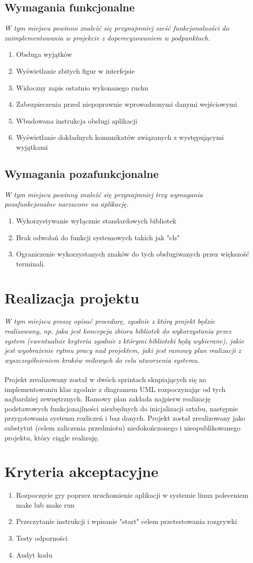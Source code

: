 \documentclass{article}
\begin{document}
\subsection{Wymagania funkcjonalne}
{\small\it W tym miejscu powinno znaleźć się przynajmniej sześć funkcjonalności do zaimplementowania w projekcie z doperecyzowaniem w podpunktach.}
\begin{enumerate}
  \item Obsługa wyjątków
  \item Wyświetlanie zbitych figur w interfejsie
  \item Widoczny zapis ostatnio wykonanego ruchu
  \item Zabezpieczenia przed niepoprawnie wprowadzonymi danymi wejściowymi
  \item Wbudowana instrukcja obsługi aplikacji
  \item Wyświetlanie dokładnych komunikatów związanych z występującymi wyjątkami
\end{enumerate}
\subsection{Wymagania pozafunkcjonalne}
{\small\it W tym miejscu powinny znaleźć się przynajmniej trzy wymagania pozafunkcjonalne narzucone na aplikację.}
\begin{enumerate}
  \item Wykorzystywanie wyłącznie standardowych bibliotek
  \item Brak odwołań do funkcji systemowych takich jak "cls"
  \item Ograniczenie wykorzystanych znaków do tych obsługiwanych przez większość terminali.
\end{enumerate}
\section{Realizacja projektu}
 {\small\it W tym miejscu proszę opisać procedurę, zgodnie z którą projekt będzie realizowany, np. jaka jest koncepcja zbioru bibliotek do wykorzystania przez system (ewentualnie kryteria zgodnie z którymi biblioteki będą wybierane), jakie jest wyobrażenie rytmu pracy nad projektem, jaki jest ramowy plan realizacji z wyszczególnieniem kroków milowych do celu utworzenia systemu.}
\\ \\
\textup{Projekt zrealizowany został w dwóch sprintach skupiających się na implementowaniu klas zgodnie z diagramem UML rozpoczynając od tych najbardziej zewnętrznych.  Ramowy plan zakłada najpierw realizację podstawowych funkcjonajlności niezbędnych do inicjalizacji sztabu, następnie przygotowania systemu rozliczeń i baz danych. Projekt został zrealizowany jako substytut (celem zaliczenia przedmiotu) niedokończonego i nieopublikowanego projektu, który ciągle realizuję.}
\section{Kryteria akceptacyjne}
\begin{enumerate}
  \item Rozpoczęcie gry poprzez uruchomienie aplikacji w systemie linux poleceniem make lub make run
  \item Przeczytanie instrukcji i wpisanie "start" celem przetestowania rozgrywki
  \item Testy odporności
  \item Audyt kodu
\end{enumerate}
\end{document}
